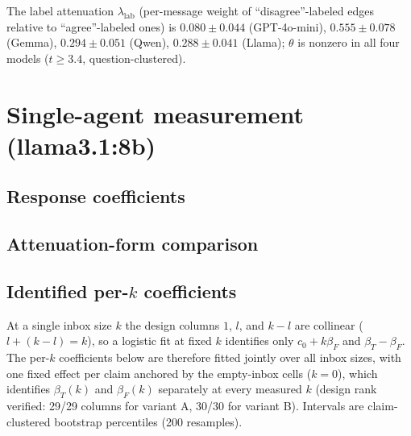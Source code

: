 \documentclass[11pt]{article}
\begin{document}
The label attenuation $\lambda_{\mathrm{lab}}$ (per-message weight of
``disagree''-labeled edges relative to ``agree''-labeled ones) is
$0.080 \pm 0.044$ (GPT-4o-mini), $0.555 \pm 0.078$ (Gemma), $0.294 \pm 0.051$
(Qwen), $0.288 \pm 0.041$ (Llama); $\theta$ is nonzero in all four models
($t \ge 3.4$, question-clustered).

\section{Single-agent measurement (llama3.1:8b)}

\subsection{Response coefficients}
\begin{center}

\end{center}

\subsection{Attenuation-form comparison}
\begin{center}

\end{center}

\subsection{Identified per-$k$ coefficients}

At a single inbox size $k$ the design columns $1$, $l$, and $k-l$ are
collinear ($l + (k-l) = k$), so a logistic fit at fixed $k$ identifies only
$c_0 + k\beta_F$ and $\beta_T - \beta_F$. The per-$k$ coefficients below are
therefore fitted jointly over all inbox sizes, with one fixed effect per claim
anchored by the empty-inbox cells ($k = 0$), which identifies
$\beta_T(k)$ and $\beta_F(k)$ separately at every measured $k$ (design rank
verified: 29/29 columns for variant A, 30/30 for variant B). Intervals are
claim-clustered bootstrap percentiles (200 resamples).
\end{document}
